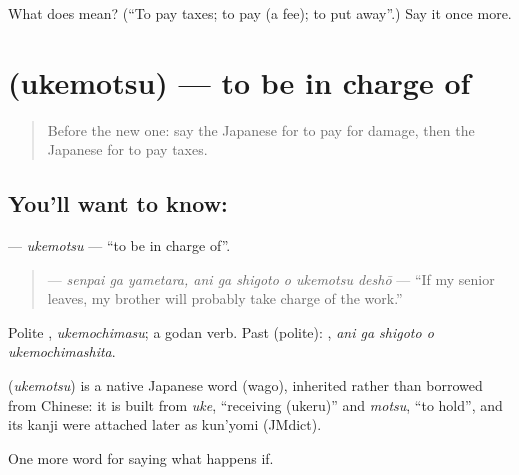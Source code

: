 \begin{tcolorbox}[breakable,colback=teal!4,colframe=teal!35!black,title={Before you move on}]
What does  mean? (\textquotedblleft{}To pay taxes; to pay (a fee); to put away\textquotedblright{}.) Say it once more.
\end{tcolorbox}
\section[\texorpdfstring{\ja{うけもつ} (ukemotsu)}{うけもつ (ukemotsu)}]{ (ukemotsu) — to be in charge of}

\label{lesson:JA-C364-ukemotsu}



\begin{quote}
Before the new one: say the Japanese for to pay for damage, then the Japanese for to pay taxes.
\end{quote}

\subsection*{You'll want to know: }
\textbf{} — \emph{ukemotsu} — \textquotedblleft{}to be in charge of\textquotedblright{}.

\begin{quote}
\textbf{   } — \emph{senpai ga yametara, ani ga shigoto o ukemotsu deshō} — \textquotedblleft{}If my senior leaves, my brother will probably take charge of the work.\textquotedblright{}
\end{quote}

Polite \textbf{}, \emph{ukemochimasu}; a godan verb. Past (polite): \textbf{  }, \emph{ani ga shigoto o ukemochimashita}.

\begin{cousinweb}
\textbf{} (\emph{ukemotsu}) is a native Japanese word (wago), inherited rather than borrowed from Chinese: it is built from \emph{uke}, \textquotedblleft{}receiving (ukeru)\textquotedblright{} and \emph{motsu}, \textquotedblleft{}to hold\textquotedblright{}, and its kanji were attached later as kun'yomi (JMdict).
\end{cousinweb}

\begin{grammarlens}[title={What you've built}]
One more word for saying what happens if.
\end{grammarlens}

